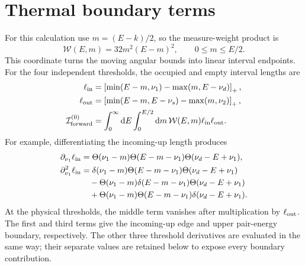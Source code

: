 \section{Thermal boundary terms}
\label{app:thermal-boundaries}
For this calculation use \(m=(E-k)/2\), so the measure-weight product is
\begin{equation}
 \mathcal W(E,m)=32m^2(E-m)^2,
 \qquad 0\leq m\leq E/2.
 \label{eq:boundary-weight}
\end{equation}
This coordinate turns the moving angular bounds into linear interval endpoints.
For the four independent thresholds, the occupied and empty interval lengths are
\begin{align}
 \ell_{\rm in}&=\left[\min(E-m,\nu_1)-\max(m,E-\nu_d)\right]_+,\notag\\
 \ell_{\rm out}&=\left[\min(E-m,E-\nu_s)-\max(m,\nu_2)\right]_+,\notag\\
 \mathcal I^{(0)}_{\rm forward}
 &=\int_0^\infty\mathrm d E\int_0^{E/2}\mathrm d m\,
 \mathcal W(E,m)\ell_{\rm in}\ell_{\rm out}.
 \label{eq:independent-intervals}
\end{align}
For example, differentiating the incoming-up length produces
\begin{align}
 \partial_{\nu_1}\ell_{\rm in}
 &=\Theta(\nu_1-m)\Theta(E-m-\nu_1)
   \Theta(\nu_d-E+\nu_1),\notag\\
 \partial_{\nu_1}^2\ell_{\rm in}
 &=\delta(\nu_1-m)\Theta(E-m-\nu_1)\Theta(\nu_d-E+\nu_1)\notag\\
 &\quad-\Theta(\nu_1-m)\delta(E-m-\nu_1)\Theta(\nu_d-E+\nu_1)\notag\\
 &\quad+\Theta(\nu_1-m)\Theta(E-m-\nu_1)\delta(\nu_d-E+\nu_1).
 \label{eq:threshold-deltas}
\end{align}
At the physical thresholds, the middle term vanishes after multiplication by \(\ell_{\rm out}\).
The first and third terms give the incoming-up edge and upper pair-energy boundary, respectively.
The other three threshold derivatives are evaluated in the same way; their separate values are retained below to expose every boundary contribution.

